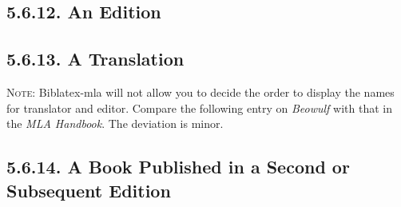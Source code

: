 \documentclass[12pt]{article}
\begin{document}
\nocite{bible84aa}\nocite{virginia93aa}\nocite{NewYorkPublicLibrary97aa}

\printbibliography[heading=blank,segment=11]


\subsection*{5.6.12. An Edition}
\newrefsegment

\nocite{crane75ab}\nocite{crane75aa}\nocite{twain93aa}\nocite{smith02aa}\nocite{shakespeare92aa}\nocite{octovian86aa}\nocite{edgeworth92aa}\nocite{austen01aa}

\printbibliography[heading=blank,segment=12]


\subsection*{5.6.13. A Translation}
\newrefsegment
\textsc{Note:} Biblatex-mla will not allow you to decide the order to display the names for translator and editor.  Compare the following entry on \emph{Beowulf} with that in the \emph{MLA Handbook}.  The deviation is minor.

\nocite{mu76aa}\nocite{hildegard-of-bingen01aa}\nocite{esquivel92aa}\nocite{beowulf01aa}\nocite{murasaki-shikibu76aa}\nocite{levi87aa}\nocite{esquivel92ab}

\printbibliography[heading=blank,segment=13]


\subsection*{5.6.14. A Book Published in a Second or Subsequent Edition}
\newrefsegment

\nocite{murasaki-shikibu85aa}\nocite{hyde86aa}\nocite{cheyfitz97aa}\nocite{chaucer57aa}\nocite{bondanella01aa}

\printbibliography[heading=blank,segment=14]

\end{document}
